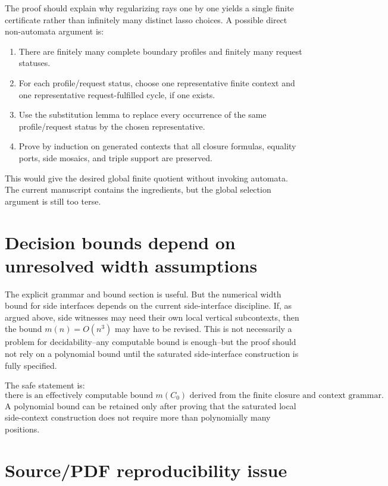 \documentclass[11pt]{article}
\begin{document}
The proof should explain why regularizing rays one by one yields a single finite certificate rather than infinitely many distinct lasso choices.  A possible direct non-automata argument is:
\begin{enumerate}[leftmargin=2em]
  \item There are finitely many complete boundary profiles and finitely many request statuses.
  \item For each profile/request status, choose one representative finite context and one representative request-fulfilled cycle, if one exists.
  \item Use the substitution lemma to replace every occurrence of the same profile/request status by the chosen representative.
  \item Prove by induction on generated contexts that all closure formulas, equality ports, side mosaics, and triple support are preserved.
\end{enumerate}
This would give the desired global finite quotient without invoking automata.  The current manuscript contains the ingredients, but the global selection argument is still too terse.

\section{Decision bounds depend on unresolved width assumptions}

The explicit grammar and bound section is useful.  But the numerical width bound for side interfaces depends on the current side-interface discipline.  If, as argued above, side witnesses may need their own local vertical subcontexts, then the bound $m(n)=O(n^3)$ may have to be revised.  This is not necessarily a problem for decidability--any computable bound is enough--but the proof should not rely on a polynomial bound until the saturated side-interface construction is fully specified.

The safe statement is:
\[
\text{there is an effectively computable bound }m(C_0)\text{ derived from the finite closure and context grammar.}
\]
A polynomial bound can be retained only after proving that the saturated local side-context construction does not require more than polynomially many positions.

\section{Source/PDF reproducibility issue}
\end{document}
